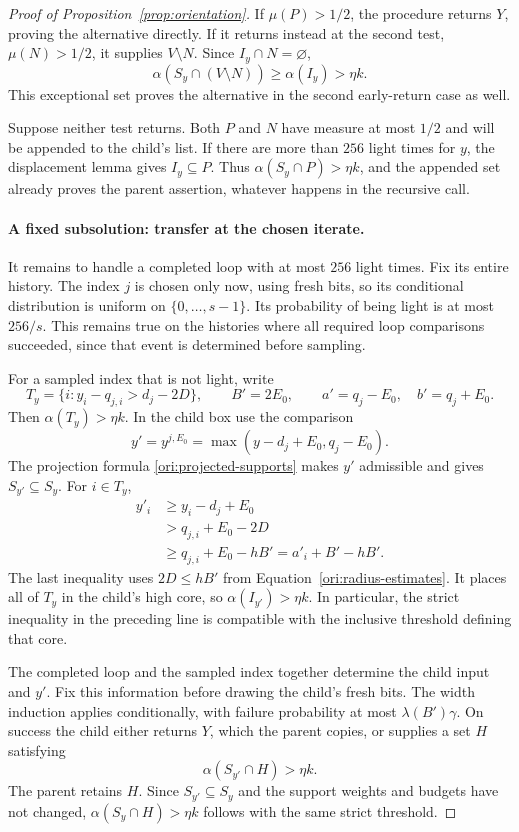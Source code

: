 \begin{proof}[Proof of Proposition~\ref{prop:orientation}]
If \(\mu(P)>1/2\), the procedure returns \(Y\), proving the
alternative directly. If it returns instead at the second test,
\(\mu(N)>1/2\), it supplies \(V\setminus N\). Since
\(I_y\cap N=\varnothing\),
\[
  \alpha(S_y\cap(V\setminus N))
  \geq\alpha(I_y)>\eta k.
\]
This exceptional set proves the alternative in the second early-return
case as well.

Suppose neither test returns. Both \(P\) and \(N\) have measure
at most \(1/2\) and will be appended to the child's list.
If there are more than \(256\) light times for \(y\), the displacement
lemma gives \(I_y\subseteq P\). Thus
\(\alpha(S_y\cap P)>\eta k\), and the appended set already proves
the parent assertion, whatever happens in the recursive call.

\paragraph{A fixed subsolution: transfer at the chosen iterate.}
It remains to handle a completed loop with at most \(256\) light
times. Fix its entire history. The index \(j\) is chosen only now,
using fresh bits, so its conditional distribution is uniform on
\(\{0,\ldots,s-1\}\). Its probability of being light is at most
\(256/s\). This remains true on the histories where all required
loop comparisons succeeded, since that event is determined before
sampling.

For a sampled index that is not light, write
\[
  T_y=\{i:y_i-q_{j,i}>d_j-2D\},
  \qquad
  B'=2E_0,
  \qquad
  a'=q_j-E_0,\quad b'=q_j+E_0.
\]
Then \(\alpha(T_y)>\eta k\). In the child box use the comparison
\[
  y'=y^{j,E_0}=\max(y-d_j+E_0,q_j-E_0).
\]
The projection formula \eqref{ori:projected-supports} makes \(y'\)
admissible and gives \(S_{y'}\subseteq S_y\). For \(i\in T_y\),
\begin{align*}
  y'_i
  &\geq y_i-d_j+E_0\\
  &>q_{j,i}+E_0-2D\\
  &\geq q_{j,i}+E_0-hB'
   =a'_i+B'-hB'.
\end{align*}
The last inequality uses \(2D\leq hB'\) from
Equation~\eqref{ori:radius-estimates}. It places all of \(T_y\)
in the child's high core, so \(\alpha(I_{y'})>\eta k\).
In particular, the strict inequality in the preceding line is
compatible with the inclusive threshold defining that core.

The completed loop and the sampled index together determine the child
input and \(y'\). Fix this information before drawing the child's
fresh bits. The width induction applies conditionally, with failure
probability at most \(\lambda(B')\gamma\).
On success the child either returns \(Y\), which the parent copies,
or supplies a set \(H\) satisfying
\[
  \alpha(S_{y'}\cap H)>\eta k.
\]
The parent retains \(H\). Since \(S_{y'}\subseteq S_y\) and the
support weights and budgets have not changed,
\(\alpha(S_y\cap H)>\eta k\) follows with the same strict threshold.


\end{proof}
